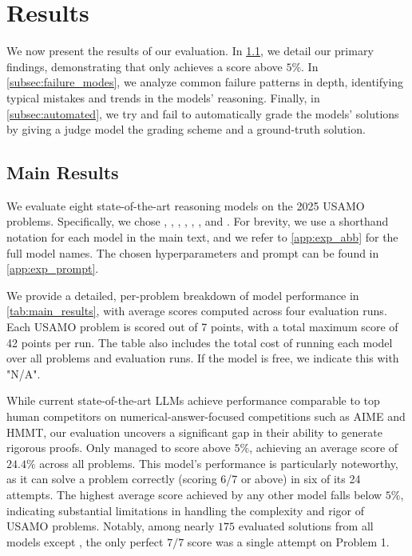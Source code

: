 \section{Results}\label{sec:results}



We now present the results of our evaluation. In \cref{subsec:main_results}, we detail our primary findings, demonstrating that only \geminipro{} achieves a score above $5\%$. In \cref{subsec:failure_modes}, we analyze common failure patterns in depth, identifying typical mistakes and trends in the models' reasoning. Finally, in \cref{subsec:automated}, we try and fail to automatically grade the models' solutions by giving a judge model the grading scheme and a ground-truth solution.

\subsection{Main Results}\label{subsec:main_results}

We evaluate eight state-of-the-art reasoning models on the 2025 USAMO problems. Specifically, we chose \qwq{} \citep{qwq32b}, \rone{} \citep{r1}, \geminipro{} \citep{deepmind2025geminipro}, \flthink{} \citep{gemini-1.5}, \oone{} \citep{o1}, \othree{} \citep{o3}, \grok{} \citep{xai2025grok3} and \claude{} \citep{anthropic2024claude}. For brevity, we use a shorthand notation for each model in the main text, and we refer to \cref{app:exp_abb} for the full model names. The chosen hyperparameters and prompt can be found in \cref{app:exp_prompt}.

We provide a detailed, per-problem breakdown of model performance in \cref{tab:main_results}, with average scores computed across four evaluation runs. Each USAMO problem is scored out of 7 points, with a total maximum score of 42 points per run. The table also includes the total cost of running each model over all problems and evaluation runs. If the model is free, we indicate this with "N/A".

While current state-of-the-art LLMs achieve performance comparable to top human competitors on numerical-answer-focused competitions such as AIME and HMMT, our evaluation uncovers a significant gap in their ability to generate rigorous proofs. Only \geminipro{} managed to score above $5\%$, achieving an average score of $24.4\%$ across all problems. This model's performance is particularly noteworthy, as it can solve a problem correctly (scoring 6/7 or above) in six of its 24 attempts. The highest average score achieved by any other model falls below $5\%$, indicating substantial limitations in handling the complexity and rigor of USAMO problems. Notably, among nearly $175$ evaluated solutions from all models except \geminipro{}, the only perfect $7/7$ score was a single \grok{} attempt on Problem 1. 

